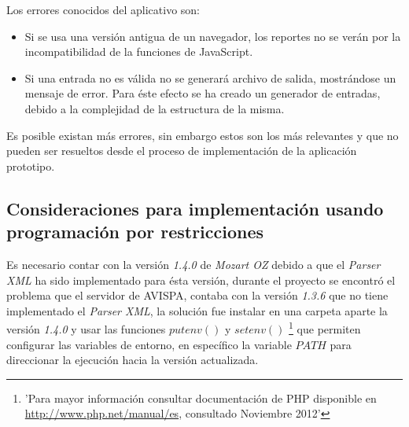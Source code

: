 Los errores conocidos del aplicativo son:

\begin{itemize}
	\item Si se usa una versión antigua de un navegador, los reportes no se verán por la incompatibilidad de la funciones de JavaScript.
	\item Si una entrada no es válida no se generará archivo de salida, mostrándose un mensaje de error. Para éste efecto se ha creado un generador de entradas, debido a la complejidad de la estructura de la misma.
\end{itemize}

Es posible existan más errores, sin embargo estos son los más relevantes y que no pueden ser resueltos desde el proceso de implementación de la aplicación prototipo.

\subsection{Consideraciones para implementación usando programación por restricciones}

Es necesario contar con la versión \textit{1.4.0} de \textit{Mozart OZ} debido a que el \textit{Parser XML} ha sido implementado para ésta versión, durante el proyecto se encontró el problema que el servidor de AVISPA, contaba con la versión \textit{1.3.6} que no tiene implementado el \textit{Parser XML}, la solución fue instalar en una carpeta aparte la versión \textit{1.4.0} y usar las funciones $putenv()$ y $setenv()$ \footnote{'Para mayor información consultar documentación de PHP disponible en \url{http://www.php.net/manual/es}, consultado Noviembre 2012'} que permiten configurar las variables de entorno, en específico la variable $PATH$ para direccionar la ejecución hacia la versión actualizada.

